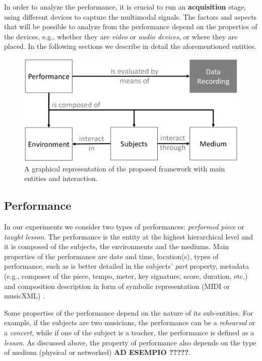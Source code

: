 In order to analyze the performance, it is crucial to run an \textbf{acquisition} stage, using different devices to capture the multimodal signals. The factors and aspects that will be possible to analyze from the performance depend on the properties of the devices, e.g., whether they are \textit{video} or \textit{audio devices}, or where they are placed. In the following sections we describe in detail the aforementioned entities.



\begin{figure}[t]
	\centering
	\includegraphics[width=\columnwidth]{img/framework.eps}
	\caption{A graphical representation of the proposed framework with main entities and interaction.}
	\label{fig:framework}
\end{figure}

\subsection{Performance}
In our experiments we consider two types of performances: \textit{performed piece} or \textit{taught lesson}. The performance is the entity at the highest hierarchical level and it is composed of the subjects, the environments and the mediums. 
Main properties of the performance are date and time, location(s), types of performance, such as is better detailed in the subjects' \textit{part} property, metadata (e.g., composer of the piece, tempo, meter, key signature, score, duration, etc.) and composition  description in form of symbolic representation (MIDI or musicXML) \cite{MIDItoolbox}.

Some properties of the performance depend on the nature of its sub-entities. For example, if the subjects are two musicians, the performance can be a \textit{rehearsal} or a \textit{concert}, while if one of the subject is a teacher, the performance is defined as a \textit{lesson}. As discussed above, the property of performance also depends on the type of medium (physical or networked) \textbf{AD ESEMPIO ?????}.   


